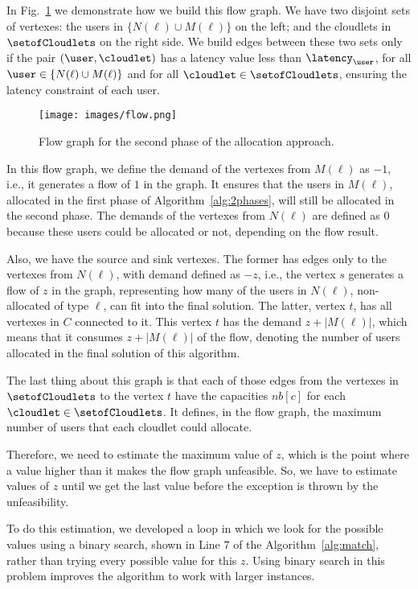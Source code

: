\documentclass[English]{ic-tese-v3}
\begin{document}
In Fig.~\ref{fig:flow_graph} we demonstrate how we build this flow graph. We have two disjoint sets of vertexes: the users in $\{N(\ell) \cup M(\ell)\}$ on the left; and the cloudlets in $\setofCloudlets$ on the right side. We build edges between these two sets only if the pair $(\user, \cloudlet)$ has a latency value less than $\latency_{\user}$, for all $\user \in \{N(\ell) \cup M(\ell)\}$ and for all $\cloudlet \in \setofCloudlets$, ensuring the latency constraint of each user. 
\begin{figure}
    \centering
    \texttt{[image: images/flow.png]}
    \caption{Flow graph for the second phase of the allocation approach.}
    \label{fig:flow_graph}
\end{figure}

In this flow graph, we define the demand of the vertexes from $M(\ell)$ as $-1$, i.e., it generates a flow of $1$ in the graph. It ensures that the users in $M(\ell)$, allocated in the first phase of Algorithm~\ref{alg:2phases}, will still be allocated in the second phase. The demands of the vertexes from $N(\ell)$ are defined as $0$ because these users could be allocated or not, depending on the flow result.

Also, we have the source and sink vertexes. The former has edges only to the vertexes from $N(\ell)$, with demand defined as $-z$, i.e., the vertex $s$ generates a flow of $z$ in the graph, representing how many of the users in $N(\ell)$, non-allocated of type $\ell$, can fit into the final solution. The latter, vertex $t$, has all vertexes in $C$ connected to it. This vertex $t$ has the demand $z + |M(\ell)|$, which means that it consumes $z + |M(\ell)|$ of the flow, denoting the number of users allocated in the final solution of this algorithm.

The last thing about this graph is that each of those edges from the vertexes in $\setofCloudlets$ to the vertex $t$ have the capacities $nb[c]$ for each $\cloudlet \in \setofCloudlets$. It defines, in the flow graph, the maximum number of users that each cloudlet could allocate.

Therefore, we need to estimate the maximum value of $z$, which is the point where a value higher than it makes the flow graph unfeasible. So, we have to estimate values of $z$ until we get the last value before the exception is thrown by the unfeasibility.

To do this estimation, we developed a loop in which we look for the possible values using a binary search, shown in Line $7$ of the Algorithm~\ref{alg:match}, rather than trying every possible value for this $z$. Using binary search in this problem improves the algorithm to work with larger instances.
\end{document}
